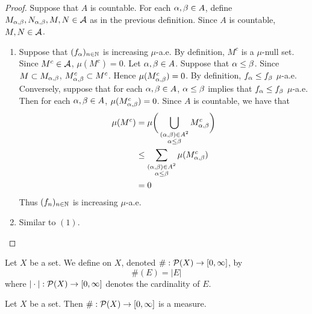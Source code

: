 \documentclass{book}
\begin{document}
	\begin{proof} Suppose that $A$ is countable. For each $\alpha, \beta \in A$, define $M_{\alpha, \beta},N_{\alpha, \beta},M,N \in \mathcal{A}$ as in the previous definition. Since $A$ is countable, $M,N \in \mathcal{A}$. 
		\begin{enumerate}
			\item Suppose that $(f_{\alpha})_{n \in \mathbb{N}}$ is increasing $\mu$-a.e. By definition, $M^c$ is a $\mu$-null set. Since $M^c \in \mathcal{A}$, $\mu(M^c) = 0$. Let $\alpha, \beta \in A$. Suppose that $\alpha \leq \beta$. Since $M \subset M_{\alpha, \beta}$, $M_{\alpha, \beta}^c \subset M^c$. Hence $\mu(M_{\alpha, \beta}^c) = 0$. By definition, $f_{\alpha} \leq f_{\beta}$ $\mu$-a.e.\\
			Conversely, suppose that for each $\alpha, \beta \in A$, $\alpha \leq \beta$ implies that $f_{\alpha} \leq f_{\beta}$ $\mu$-a.e. Then for each $\alpha, \beta \in A$, $\mu(M_{\alpha, \beta}^c) = 0$. Since $A$ is countable, we have that
			\begin{align*}
				\mu(M^c) 
				& = \mu \bigg( \bigcup\limits_{\substack{(\alpha, \beta) \in A^2 \\ \alpha \leq \beta}} M_{\alpha, \beta}^c \bigg) \\
				& \leq \sum_{\substack{(\alpha, \beta) \in A^2 \\ \alpha \leq \beta}} \mu(M_{\alpha, \beta}^c) \\
				& = 0
			\end{align*}
			Thus $(f_n)_{n \in \mathbb{N}}$ is increasing $\mu$-a.e.
			\item Similar to $(1)$.
		\end{enumerate}
	\end{proof}

	\begin{defn} 
		Let $X$ be a set. We define  on $X$, denoted $\#: \mathcal{P}(X) \rightarrow [0,\infty]$, by
		$$\#(E) = |E|$$ where $|\cdot|: \mathcal{P}(X) \rightarrow [0,\infty]$ denotes the cardinality of $E$. 
	\end{defn}

	\begin{ex}  
		Let $X$ be a set. Then $\#: \mathcal{P}(X) \rightarrow [0,\infty]$ is a measure. \\
		\\
	\end{ex}
\end{document}
